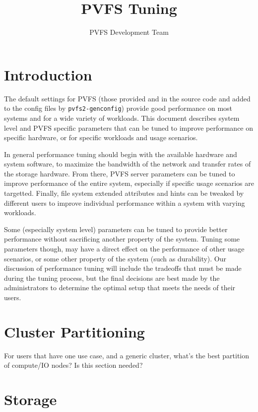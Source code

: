 \documentclass[11pt,letterpaper]{article}
\title{PVFS Tuning}
\author{ PVFS Development Team }
\begin{document}
\maketitle

\tableofcontents
\thispagestyle{empty}

\section{Introduction}

The default settings for PVFS (those provided and in the source code
and added to the config files by \texttt{pvfs2-genconfig})
provide good performance on most systems and for a wide variety of workloads.
This document describes system level and PVFS specific parameters 
that can be tuned to improve
performance on specific hardware, or for specific workloads and usage
scenarios.  

In general performance tuning should begin with the available hardware
and system software, to maximize the bandwidth of the network and
transfer rates of the storage hardware.  From there, PVFS server
parameters can be tuned to improve performance of the
entire system, especially
if specific usage scenarios are targetted.  Finally, file system 
extended attributes and hints can be tweaked by different users to
improve individual performance within a system with varying workloads.

Some (especially system level) parameters can be tuned to provide better
performance without sacrificing another property of the system.  
Tuning some parameters though, may have a direct effect on the
performance of other usage scenarios, or some other property of the
system (such as durability).  
Our discussion of performance tuning will include the tradeoffs
that must be made during the tuning process, but the final decisions are best
made by the administrators to determine the optimal 
setup that meets the needs of their users.

\section{Cluster Partitioning}

For users that have one use case, and a generic cluster, what's the best
partition of compute/IO nodes?  Is this section needed?

\section{Storage}
\end{document}
